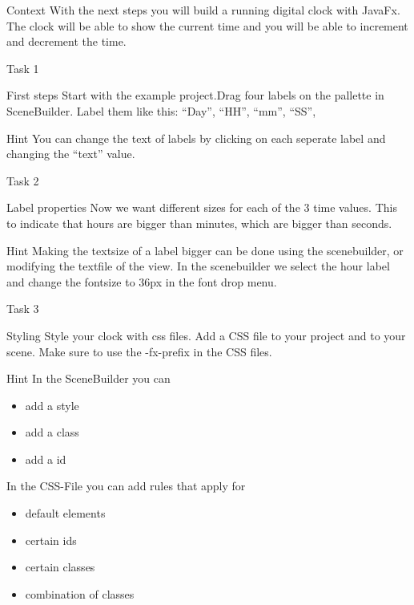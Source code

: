 \begin{frame}{Context}
With the next steps you will build a running digital clock with JavaFx. The clock will be able to show the current time and you will be able to increment and decrement the time. 
\end{frame}
\begin{frame}{Task 1}
\begin{block}{First steps}
Start with the example project.Drag four labels on the pallette in SceneBuilder. Label them like  this: “Day”, “HH”, “mm”, “SS”, 
\end{block}
\pause
\begin{exampleblock}{Hint}
You can change the text of labels by clicking on each seperate label and changing the “text” value.  
\end{exampleblock}
\end{frame}
\begin{frame}{Task 2}
\begin{block}{Label properties}
Now we want different sizes for each of the 3 time values. This to indicate that hours are bigger than minutes, which are bigger than seconds. 
\end{block}
\pause
\begin{exampleblock}{Hint}
Making the textsize of a label bigger can be done using the scenebuilder, or modifying the textfile of the view. In the scenebuilder we select the hour label and change the fontsize to 36px in the font drop menu.
\end{exampleblock}
\end{frame}
\begin{frame}{Task 3}
\begin{block}{Styling}
Style your clock with css files. Add a CSS file to your project and to your scene. Make sure to use the -fx-prefix in the CSS files.
\end{block}
\pause
\begin{exampleblock}{Hint}
In the SceneBuilder you can
\begin{itemize}
\item add a style
\item add a class
\item add a id
\end{itemize}
In the CSS-File you can add rules that apply for 
\begin{itemize}
\item default elements
\item certain ids
\item certain classes
\item combination of classes
\end{itemize}
\end{exampleblock}
\end{frame}

